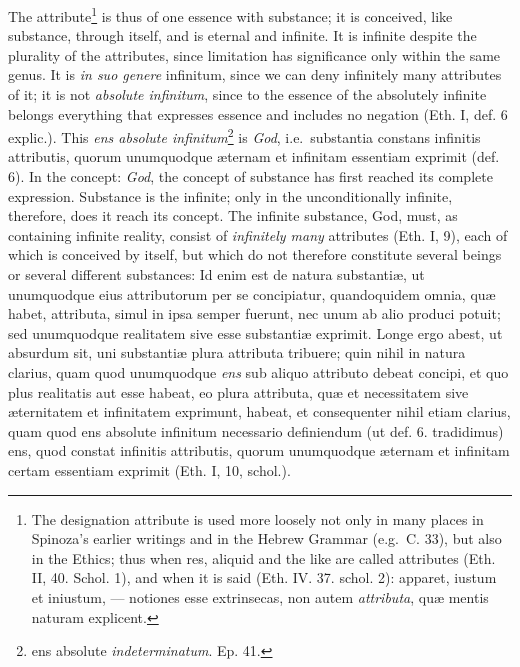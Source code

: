 \documentclass[12pt,a4paper,openany]{book}
\newcommand{\opage}[1]{\marginnote{\footnotesize\textit{[#1]}}}
\begin{document}
The attribute\footnote{The designation attribute is used more loosely not only
in many places in Spinoza's earlier writings and in the Hebrew
Grammar (e.g.\ C. 33), but also in the Ethics; thus when res,
aliquid and the like are called attributes (Eth. II, 40. Schol. 1), and when it is
said (Eth. IV. 37. schol. 2): apparet, iustum et iniustum, ---
notiones esse extrinsecas, non autem \emph{attributa}, quæ mentis naturam
explicent.} is thus of one essence with substance; it is conceived,
like substance, through itself, and is eternal and infinite. It is infinite
despite the plurality of the attributes, since limitation has significance only
within the same genus. It is \emph{in suo genere} infinitum, since we
can deny infinitely many attributes of it; it is not
\emph{absolute infinitum}, since to the essence of the absolutely infinite
belongs everything that expresses essence and includes no negation (Eth.
I, def. 6 explic.). This \emph{ens absolute infinitum}\footnote{ens
absolute \emph{indeterminatum}. Ep. 41.} is \emph{God}, i.e.\ substantia constans
infinitis attributis, quorum unumquodque æternam et infinitam
essentiam exprimit (def. 6). In the concept: \emph{God}, the concept of substance has
first reached its complete expression. Substance is the infinite;
only in the unconditionally infinite, therefore, does it reach its concept. The
infinite substance, God, must, as containing infinite reality,
consist of \emph{infinitely many} attributes (Eth. I, 9), each of which
is conceived by itself, but which do not therefore
\opage{50}\setcounter{footnote}{0}constitute several beings or several different substances: Id enim
est de natura substantiæ, ut unumquodque eius attributorum per se
concipiatur, quandoquidem omnia, quæ habet, attributa, simul in ipsa
semper fuerunt, nec unum ab alio produci potuit; sed unumquodque
realitatem sive esse substantiæ exprimit. Longe ergo abest, ut
absurdum sit, uni substantiæ plura attributa tribuere; quin nihil in
natura clarius, quam quod unumquodque \emph{ens} sub aliquo attributo debeat
concipi, et quo plus realitatis aut esse habeat, eo plura attributa,
quæ et necessitatem sive æternitatem et infinitatem exprimunt, habeat,
et consequenter nihil etiam clarius, quam quod ens absolute infinitum
necessario definiendum (ut def. 6. tradidimus) ens, quod constat
infinitis attributis, quorum unumquodque æternam et infinitam certam
essentiam exprimit (Eth. I, 10, schol.).
\end{document}
